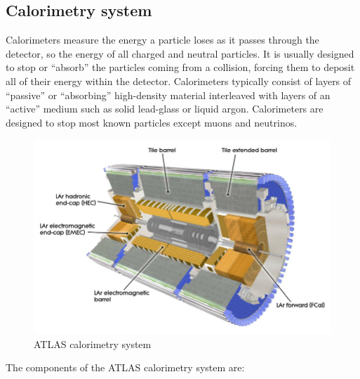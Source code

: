 \documentclass[a4paper, oneside, 11pt, openright]{book}
\begin{document}
				\subsection{Calorimetry system}
					\cite{Calo intro}Calorimeters measure the energy a particle loses as it passes through the detector, so the energy of all charged and neutral particles. It is usually designed to stop  or “absorb” the particles coming from a collision, forcing them to deposit all of their energy within the detector. Calorimeters typically consist of layers of “passive” or “absorbing” high-density material interleaved with layers of an “active” medium such as solid lead-glass or liquid argon. Calorimeters are designed to stop most known particles except muons and neutrinos.
					\begin{figure} [h!]
						\centering
						\includegraphics[width=.6\textwidth]{tesi_images/calorimeters.png} 
						\caption{ATLAS calorimetry system}
						\label{fig:Calorimetry}
					\end{figure}
					The components of the ATLAS calorimetry system are: \cite{LAr TDR} \cite{Tile TDR}
\end{document}
